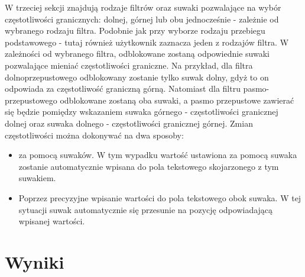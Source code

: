 W trzeciej sekcji znajdują rodzaje filtrów oraz suwaki pozwalające na wybór częstotliwości granicznych: dolnej, górnej lub obu jednocześnie - zależnie od wybranego rodzaju filtra. Podobnie jak przy wyborze rodzaju przebiegu podstawowego - tutaj również użytkownik zaznacza jeden z rodzajów filtra. W zależności od wybranego filtra, odblokowane zostaną odpowiednie suwaki pozwalające mieniać częstotliwości graniczne. Na przykład, dla filtra dolnoprzepustowego odblokowany zostanie tylko suwak dolny, gdyż to on odpowiada za częstotliwość graniczną górną. Natomiast dla filtru pasmo-przepustowego odblokowane zostaną oba suwaki, a pasmo przepustowe zawierać się będzie pomiędzy wskazaniem suwaka górnego - częstotliwości granicznej dolnej oraz suwaka dolnego - częstotliwości granicznej górnej.
Zmian częstotliwości można dokonywać na dwa sposoby:
\begin{itemize}
	\item za pomocą suwaków. W tym wypadku wartość ustawiona za pomocą suwaka zostanie automatycznie wpisana do pola tekstowego skojarzonego z tym suwakiem.
	\item Poprzez precyzyjne wpisanie wartości do pola tekstowego obok suwaka. W tej sytuacji suwak automatycznie się przesunie na pozycję odpowiadającą wpisanej wartości.
\end{itemize}
\section{Wyniki}

